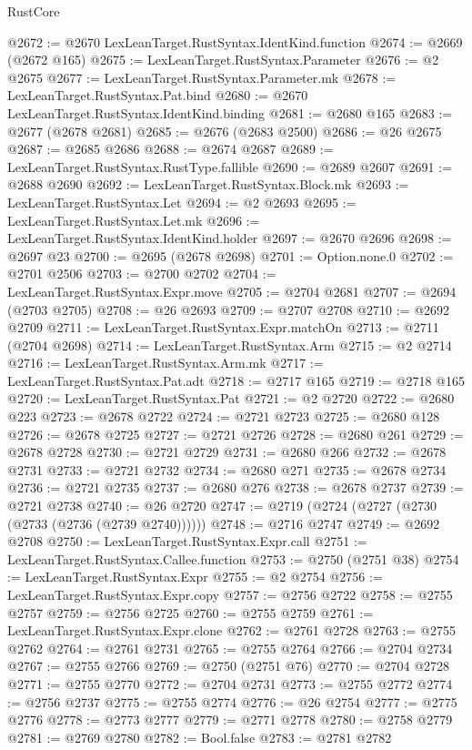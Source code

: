 \begin{lexlean}{RustCore}
\begin{coremodule}
@2672 := @2670 LexLeanTarget.RustSyntax.IdentKind.function
@2674 := @2669 (@2672 @165)
@2675 := LexLeanTarget.RustSyntax.Parameter
@2676 := @2 @2675
@2677 := LexLeanTarget.RustSyntax.Parameter.mk
@2678 := LexLeanTarget.RustSyntax.Pat.bind
@2680 := @2670 LexLeanTarget.RustSyntax.IdentKind.binding
@2681 := @2680 @165
@2683 := @2677 (@2678 @2681)
@2685 := @2676 (@2683 @2500)
@2686 := @26 @2675
@2687 := @2685 @2686
@2688 := @2674 @2687
@2689 := LexLeanTarget.RustSyntax.RustType.fallible
@2690 := @2689 @2607
@2691 := @2688 @2690
@2692 := LexLeanTarget.RustSyntax.Block.mk
@2693 := LexLeanTarget.RustSyntax.Let
@2694 := @2 @2693
@2695 := LexLeanTarget.RustSyntax.Let.mk
@2696 := LexLeanTarget.RustSyntax.IdentKind.holder
@2697 := @2670 @2696
@2698 := @2697 @23
@2700 := @2695 (@2678 @2698)
@2701 := Option.none.{0}
@2702 := @2701 @2506
@2703 := @2700 @2702
@2704 := LexLeanTarget.RustSyntax.Expr.move
@2705 := @2704 @2681
@2707 := @2694 (@2703 @2705)
@2708 := @26 @2693
@2709 := @2707 @2708
@2710 := @2692 @2709
@2711 := LexLeanTarget.RustSyntax.Expr.matchOn
@2713 := @2711 (@2704 @2698)
@2714 := LexLeanTarget.RustSyntax.Arm
@2715 := @2 @2714
@2716 := LexLeanTarget.RustSyntax.Arm.mk
@2717 := LexLeanTarget.RustSyntax.Pat.adt
@2718 := @2717 @165
@2719 := @2718 @165
@2720 := LexLeanTarget.RustSyntax.Pat
@2721 := @2 @2720
@2722 := @2680 @223
@2723 := @2678 @2722
@2724 := @2721 @2723
@2725 := @2680 @128
@2726 := @2678 @2725
@2727 := @2721 @2726
@2728 := @2680 @261
@2729 := @2678 @2728
@2730 := @2721 @2729
@2731 := @2680 @266
@2732 := @2678 @2731
@2733 := @2721 @2732
@2734 := @2680 @271
@2735 := @2678 @2734
@2736 := @2721 @2735
@2737 := @2680 @276
@2738 := @2678 @2737
@2739 := @2721 @2738
@2740 := @26 @2720
@2747 := @2719 (@2724 (@2727 (@2730 (@2733 (@2736 (@2739 @2740))))))
@2748 := @2716 @2747
@2749 := @2692 @2708
@2750 := LexLeanTarget.RustSyntax.Expr.call
@2751 := LexLeanTarget.RustSyntax.Callee.function
@2753 := @2750 (@2751 @38)
@2754 := LexLeanTarget.RustSyntax.Expr
@2755 := @2 @2754
@2756 := LexLeanTarget.RustSyntax.Expr.copy
@2757 := @2756 @2722
@2758 := @2755 @2757
@2759 := @2756 @2725
@2760 := @2755 @2759
@2761 := LexLeanTarget.RustSyntax.Expr.clone
@2762 := @2761 @2728
@2763 := @2755 @2762
@2764 := @2761 @2731
@2765 := @2755 @2764
@2766 := @2704 @2734
@2767 := @2755 @2766
@2769 := @2750 (@2751 @76)
@2770 := @2704 @2728
@2771 := @2755 @2770
@2772 := @2704 @2731
@2773 := @2755 @2772
@2774 := @2756 @2737
@2775 := @2755 @2774
@2776 := @26 @2754
@2777 := @2775 @2776
@2778 := @2773 @2777
@2779 := @2771 @2778
@2780 := @2758 @2779
@2781 := @2769 @2780
@2782 := Bool.false
@2783 := @2781 @2782

\end{coremodule}
\end{lexlean}
